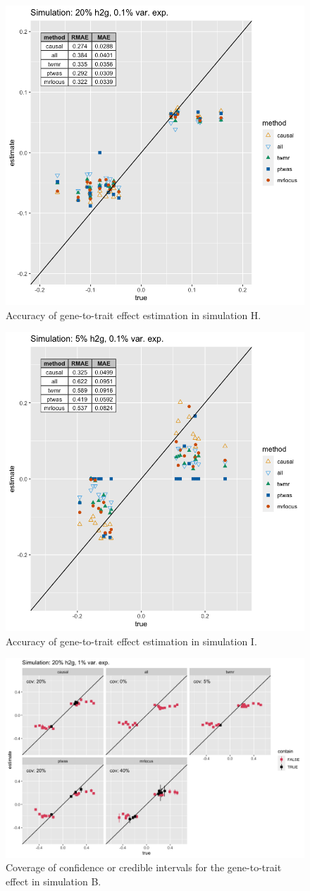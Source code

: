 \documentclass[11pt]{article}
\begin{document}
\begin{figure}[!ht]
  \centering
  \includegraphics[width=.6\textwidth]{figs/sim7.png}
  \caption{Accuracy of gene-to-trait effect estimation in simulation H.}
\end{figure}

\begin{figure}[!ht]
  \centering
  \includegraphics[width=.6\textwidth]{figs/sim9.png}
  \caption{Accuracy of gene-to-trait effect estimation in simulation I.}
\end{figure}

\begin{figure}[!ht]
  \centering
  \includegraphics[width=.8\textwidth]{figs/cover3.png}
  \caption{Coverage of confidence or credible intervals for the
    gene-to-trait effect in simulation B.}
\end{figure}
\end{document}
